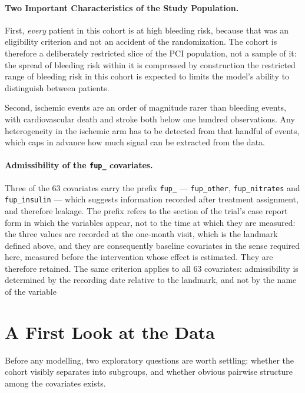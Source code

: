 \paragraph{Two Important Characteristics of the Study Population.}
First, \emph{every} patient in this cohort is at high bleeding risk, because
that was an eligibility criterion \citep{valgimigli2021appendix} and not an accident of the randomization.
The cohort is therefore a deliberately restricted slice of the PCI population,
not a sample of it: the spread of bleeding risk within it is compressed by
construction the restricted range of 
bleeding risk in this cohort is expected to limits the model's ability to distinguish between patients.

Second, ischemic events are an order of magnitude rarer than bleeding events,
with cardiovascular death and stroke both below one hundred observations. Any
heterogeneity in the ischemic arm  has to be detected from
that handful of events, which caps in advance how much signal can be extracted from the data.

\paragraph{Admissibility of the \texttt{fup\_} covariates.}
Three of the 63 covariates carry the prefix \texttt{fup\_} —
\texttt{fup\_other}, \texttt{fup\_nitrates} and \texttt{fup\_insulin} — which
suggests information recorded after treatment assignment, and therefore
leakage. The prefix refers to the section of the trial's case report form in
which the variables appear, not to the time at which they are measured: the
three values are recorded at the one-month visit, which is the landmark defined
above, and they are consequently baseline covariates in the sense required
here, measured before the intervention whose effect is estimated. They are
therefore retained. The same criterion applies to all 63 covariates:
admissibility is determined by the recording date relative to the landmark, and
not by the name of the variable

\section{A First Look at the Data}

Before any modelling, two exploratory questions are worth settling: whether
the cohort visibly separates into subgroups, and whether obvious pairwise
structure among the covariates exists.

